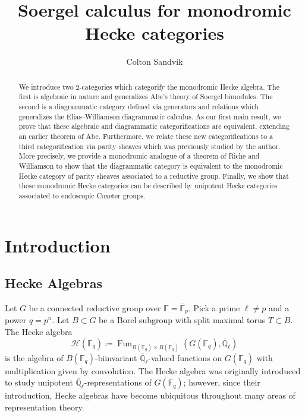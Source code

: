 \documentclass{amsart}
\title{Soergel calculus for monodromic Hecke categories}
\author{Colton Sandvik}
\date{}
\newcommand{\Q}{\mathbb{Q}}
\newcommand{\F}{\mathbb{F}}
\newcommand{\scrH}{\mathcal{H}}
\DeclareMathOperator{\Fun}{Fun}
\theoremstyle{definition}
\numberwithin{equation}{subsection}
\begin{document}
\begin{abstract}
        We introduce two 2-categories which categorify the monodromic Hecke algebra. 
        The first is algebraic in nature and generalizes Abe's theory of Soergel bimodules. 
        The second is a diagrammatic category defined via generators and relations which generalizes the Elias--Williamson diagrammatic calculus. 
        As our first main result, we prove that these algebraic and diagrammatic categorifications are equivalent, extending an earlier theorem of Abe. 
        Furthermore, we relate these new categorifications to a third categorification via parity sheaves which was previously studied by the author. 
        More precisely, we provide a monodromic analogue of a theorem of Riche and Williamson to show that the diagrammatic category is equivalent to the monodromic Hecke category of parity sheaves associated to a reductive group. 
        Finally, we show that these monodromic Hecke categories can be described by unipotent Hecke categories associated to endoscopic Coxeter groups.
\end{abstract}

	\maketitle

        \begingroup
        \hypersetup{hidelinks}
	\tableofcontents
        \endgroup

    \section{Introduction}
\subsection{Hecke Algebras}

Let $G$ be a connected reductive group over $\F = \overline{\F}_p$. Pick a prime $\ell \neq p$ and a power $q = p^n$.
Let $B \subset G$ be a Borel subgroup with split maximal torus $T \subset B$.
The Hecke algebra 
\[ \scrH (\F_q) \coloneq \Fun_{B (\F_q) \times B (\F_q)} (G (\F_q), \overline{\Q}_\ell)\] 
is the algebra of $B (\F_q)$-biinvariant $\overline{\Q}_\ell$-valued functions on $G (\F_q)$ with multiplication given by convolution.
The Hecke algebra was originally introduced to study unipotent $\overline{\Q}_\ell$-representations of $G (\F_q)$; however, since their introduction, Hecke algebras have become ubiquitous throughout many areas of representation theory. 
\end{document}
